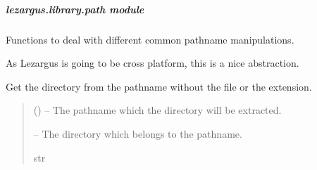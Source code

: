 \documentclass[letterpaper,11pt,english]{sphinxmanual}
\begin{document}
\sphinxstepscope


\subparagraph{lezargus.library.path module}
\label{\detokenize{code/lezargus.library.path:module-lezargus.library.path}}\label{\detokenize{code/lezargus.library.path:lezargus-library-path-module}}\label{\detokenize{code/lezargus.library.path::doc}}
\sphinxAtStartPar
Functions to deal with different common pathname manipulations.

\sphinxAtStartPar
As Lezargus is going to be cross platform, this is a nice abstraction.

\begin{savenotes}\begin{fulllineitems}
\label{\detokenize{code/lezargus.library.path:lezargus.library.path.get_directory}}
\pysigstartsignatures
{}
\pysigstopsignatures
\sphinxAtStartPar
Get the directory from the pathname without the file or the extension.
\begin{quote}\begin{description}
\sphinxAtStartPar
{} () – The pathname which the directory will be extracted.

\sphinxAtStartPar
{} – The directory which belongs to the pathname.

\sphinxAtStartPar
str

\end{description}\end{quote}

\end{fulllineitems}\end{savenotes}

\end{document}
